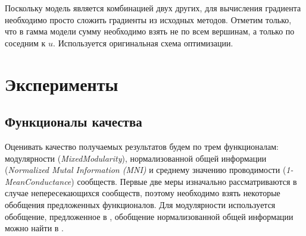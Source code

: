 \documentclass{ITaSconf}
\begin{document}
	Поскольку модель является комбинацией двух других, для вычисления градиента необходимо просто сложить градиенты из исходных методов.
	Отметим только, что в гамма модели сумму необходимо взять не по всем вершинам, а только по соседним к $u$.
	Используется оригинальная схема оптимизации.
	
	\section{Эксперименты}
	
	\subsection{Функционалы качества}
	Оценивать качество получаемых результатов будем по трем функционалам: модулярности (\textit{MixedModularity}), нормализованной общей информации (\textit{Normalized Mutal Information (MNI)} и среднему значению проводимости (\textit{1-MeanConductance}) сообществ.
	Первые две меры изначально рассматриваются в случае непересекающихся сообществ, поэтому необходимо взять некоторые обобщения предложенных функционалов. Для модулярности используется обобщение, предложенное в \cite{xie2013overlapping}, обобщение нормализованной общей информации можно найти в \cite{lancichinetti2009detecting}. 
	
\end{document}
